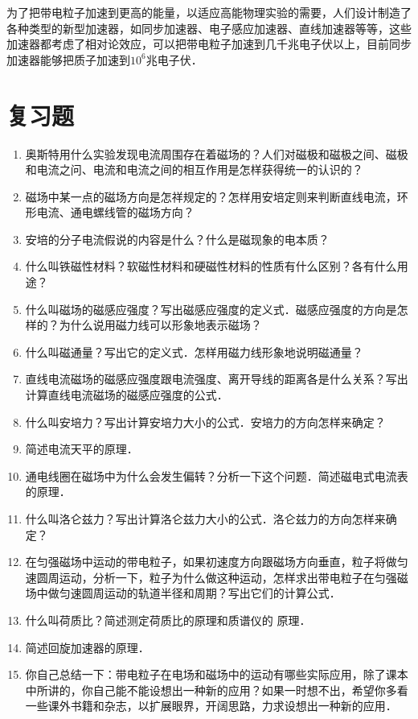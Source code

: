 为了把带电粒子加速到更高的能量，以适应高能物理实验的需要，人们设计制造了各种类型的新型加速器，如同步加速器、电子感应加速器、直线加速器等等，这些加速器都考虑了相对论效应，可以把带电粒子加速到几千兆电子伏以上，目前同步加速器能够把质子加速到$10^6$兆电子伏．

\section*{复习题}
\begin{enumerate}
    \item 奥斯特用什么实验发现电流周围存在着磁场的？人们对磁极和磁极之间、磁极和电流之问、电流和电流之间的相互作用是怎样获得统一的认识的？
    \item 磁场中某一点的磁场方向是怎祥规定的？怎样用安培定则来判断直线电流，环形电流、通电螺线管的磁场方向？
    \item 安培的分子电流假说的内容是什么？什么是磁现象的电本质？
    \item 什么叫铁磁性材料？软磁性材料和硬磁性材料的性质有什么区别？各有什么用途？
    \item 什么叫磁场的磁感应强度？写出磁感应强度的定义式．磁感应强度的方向是怎样的？为什么说用磁力线可以形象地表示磁场？
    \item 什么叫磁通量？写出它的定义式．怎样用磁力线形象地说明磁通量？
    
    \item 直线电流磁场的磁感应强度跟电流强度、离开导线的距离各是什么关系？写出计算直线电流磁场的磁感应强度的公式．
    \item 什么叫安培力？写出计算安培力大小的公式．安培力的方向怎样来确定？
    \item 简述电流天平的原理．\item 通电线圈在磁场中为什么会发生偏转？分析一下这个问题．简述磁电式电流表的原理．
    \item 什么叫洛仑兹力？写出计算洛仑兹力大小的公式．洛仑兹力的方向怎样来确定？
    \item 在匀强磁场中运动的带电粒子，如果初速度方向跟磁场方向垂直，粒子将做匀速圆周运动，分析一下，粒子为什么做这种运动，怎样求出带电粒子在匀强磁场中做匀速圆周运动的轨道半径和周期？写出它们的计算公式．
    \item 什么叫荷质比？简述测定荷质比的原理和质谱仪的
    原理．
    \item 简述回旋加速器的原理．\item 你自己总结一下：带电粒子在电场和磁场中的运动有哪些实际应用，除了课本中所讲的，你自己能不能设想出一种新的应用？如果一时想不出，希望你多看一些课外书籍和杂志，以扩展眼界，开阔思路，力求设想出一种新的应用．
\end{enumerate}

